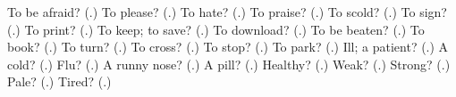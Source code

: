 \begin{tcolorbox}[breakable,colback=teal!4,colframe=teal!35!black,title={Before you move on}]
To be afraid? (\textbf{}.) To please? (\textbf{}.) To hate? (\textbf{}.) To praise? (\textbf{}.) To scold? (\textbf{}.) To sign? (\textbf{}.) To print? (\textbf{}.) To keep; to save? (\textbf{}.) To download? (\textbf{}.) To be beaten? (\textbf{}.) To book? (\textbf{}.) To turn? (\textbf{}.) To cross? (\textbf{}.) To stop? (\textbf{}.) To park? (\textbf{}.) Ill; a patient? (\textbf{}.) A cold? (\textbf{}.) Flu? (\textbf{}.) A runny nose? (\textbf{}.) A pill? (\textbf{}.) Healthy? (\textbf{}.) Weak? (\textbf{}.) Strong? (\textbf{}.) Pale? (\textbf{}.) Tired? (\textbf{}.)
\end{tcolorbox}
